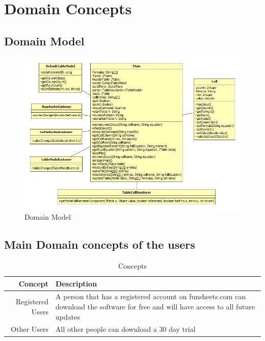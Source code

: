 \documentclass[12pt]{article}
\begin{document}
\section{Domain Concepts}
\subsection{Domain Model}

\begin{figure}[htbp]
\includegraphics{DomainModel.jpg}
\caption{Domain Model}
\label{fig:Domain-model-diagram}
\end{figure}

\clearpage

\subsection{Main Domain concepts of the users}
\begin{table}[htbp]
\caption{Concepts}
\begin{center}
\begin{tabular}{|r | p{10cm}|}
\hline
Concept & Description \\\hline\hline
Registered Users & A person that has a registered account on funsheets.com can download the software for free and will have access to all future updates \\\hline\hline
Other Users & All other people can download a 30 day trial\\\hline
\end{tabular}
\end{center}
\end{table}
\end{document}
